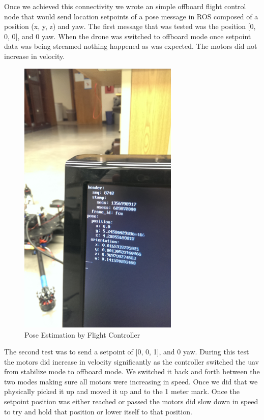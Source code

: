 \begin{itemize}
\begin{itemize}
\noindent Once we achieved this connectivity we wrote an simple offboard flight control node that would send location setpoints of a pose message in ROS composed of a position (x, y, z) and yaw. The first message that was tested was the position [0, 0, 0], and 0 yaw. When the drone was switched to offboard mode once setpoint data was being streamed nothing happened as was expected. The motors did not increase in velocity.\par


\begin{figure}[h]
\includegraphics[width=3in]{messages.jpg}
\centering
\caption{Pose Estimation by Flight Controller}
\label{fig:messages}
\end{figure}

\noindent The second test was to send a setpoint of [0, 0, 1], and 0 yaw. During this test the motors did increase in velocity significantly as the controller switched the uav from stabilize mode to offboard mode. We switched it back and forth between the two modes making sure all motors were increasing in speed. Once we did that we physically picked it up and moved it up and to the 1 meter mark. Once the setpoint position was either reached or passed the motors did slow down in speed to try and hold that position or lower itself to that position.\par


\end{itemize}
\end{itemize}
